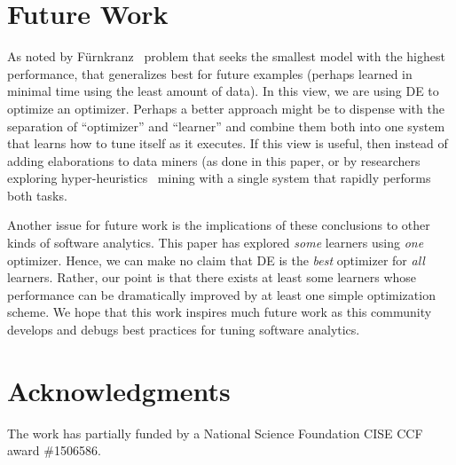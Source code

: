 \documentclass{sig-alternative}
\begin{document}
\section{Future Work}

 As noted by
F\"{u}rnkranz~
problem that seeks the smallest model with the highest performance, 
that generalizes best for
future examples (perhaps learned in minimal time using the least amount of data).
In this view, we are using DE to optimize an optimizer. Perhaps a better approach might be
to dispense with the separation of ``optimizer'' and ``learner'' and combine them both
into one system that learns how to tune itself as it executes. If this view is useful,
then instead of adding elaborations to data miners (as done in this paper, or by researchers
exploring hyper-heuristics~
mining with a single system that rapidly performs both tasks.

Another issue for future work is the implications of these
conclusions to other kinds of software analytics.
 This paper has explored  {\em some} learners using {\em one}  optimizer. Hence, we can make
no claim that DE is the {\em best} optimizer for {\em all} learners.
Rather, our point is that there exists at least some learners
whose performance can be dramatically improved by 
at least one simple optimization scheme.  We hope that this work inspires
much future work as this community develops and debugs best practices for tuning
software analytics.
 
 

\section*{Acknowledgments}
The work has partially funded by a National Science Foundation CISE CCF award \#1506586.
 
\vspace*{0.5mm}
 
 


\balance
  

   



  


  
\end{document}
